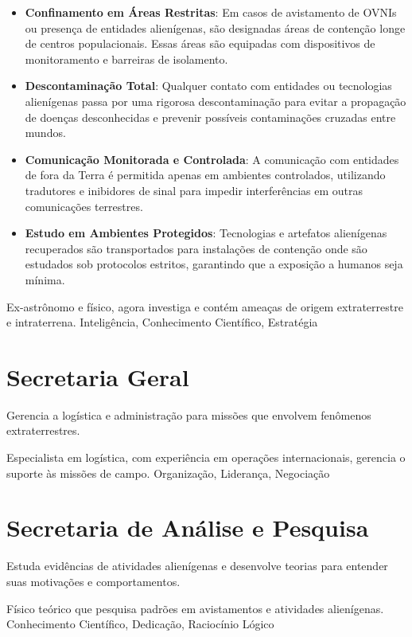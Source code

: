 \begin{itemize}
    \item \textbf{Confinamento em Áreas Restritas}: Em casos de avistamento de OVNIs ou presença de entidades alienígenas, são designadas áreas de contenção longe de centros populacionais. Essas áreas são equipadas com dispositivos de monitoramento e barreiras de isolamento.
    \item \textbf{Descontaminação Total}: Qualquer contato com entidades ou tecnologias alienígenas passa por uma rigorosa descontaminação para evitar a propagação de doenças desconhecidas e prevenir possíveis contaminações cruzadas entre mundos.
    \item \textbf{Comunicação Monitorada e Controlada}: A comunicação com entidades de fora da Terra é permitida apenas em ambientes controlados, utilizando tradutores e inibidores de sinal para impedir interferências em outras comunicações terrestres.
    \item \textbf{Estudo em Ambientes Protegidos}: Tecnologias e artefatos alienígenas recuperados são transportados para instalações de contenção onde são estudados sob protocolos estritos, garantindo que a exposição a humanos seja mínima.
\end{itemize}


{Ex-astrônomo e físico, agora investiga e contém ameaças de origem extraterrestre e intraterrena.}
{Inteligência, Conhecimento Científico, Estratégia}

\section{Secretaria Geral}
Gerencia a logística e administração para missões que envolvem fenômenos extraterrestres.

{Especialista em logística, com experiência em operações internacionais, gerencia o suporte às missões de campo.}
{Organização, Liderança, Negociação}

\section{Secretaria de Análise e Pesquisa}
Estuda evidências de atividades alienígenas e desenvolve teorias para entender suas motivações e comportamentos.

{Físico teórico que pesquisa padrões em avistamentos e atividades alienígenas.}
{Conhecimento Científico, Dedicação, Raciocínio Lógico}

